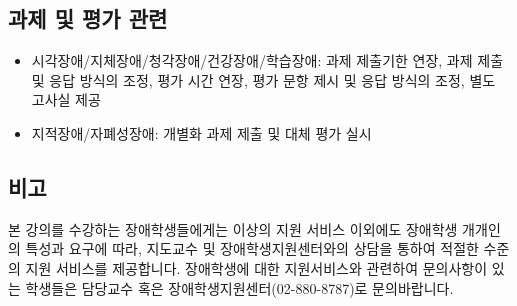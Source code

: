 \documentclass{article}
\begin{document}
\subsection{과제 및 평가 관련}
\medskip
\begin{itemize}
    \item 시각장애/지체장애/청각장애/건강장애/학습장애: 과제 제출기한 연장, 과제 제출 및 응답 방식의 조정, 평가 시간 연장, 평가 문항 제시 및 응답 방식의 조정, 별도 고사실 제공
    \item 지적장애/자폐성장애: 개별화 과제 제출 및 대체 평가 실시
\end{itemize}
\subsection{비고}
\medskip
본 강의를 수강하는 장애학생들에게는 이상의 지원 서비스 이외에도 장애학생 개개인의 특성과 요구에 따라, 지도교수 및 장애학생지원센터와의 상담을 통하여 적절한 수준의 지원 서비스를 제공합니다. 장애학생에 대한 지원서비스와 관련하여 문의사항이 있는 학생들은 담당교수 혹은 장애학생지원센터(02-880-8787)로 문의바랍니다.
\end{document}

